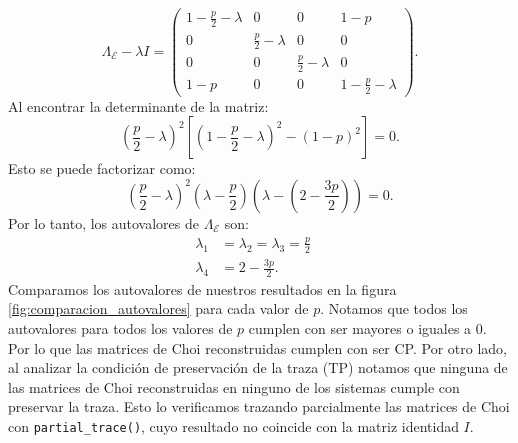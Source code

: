 \documentclass[letterpaper,12pt]{thesisECFM}
\theoremstyle{plain}
\theoremstyle{definition}
\theoremstyle{remark}
\newcommand{\1}{\mathbb{1}}
\begin{document}
\begin{equation}
\Lambda_\mathcal{E} - \lambda I = \begin{pmatrix}
1 - \frac{p}{2} - \lambda & 0 & 0 & 1 - p \\
0 & \frac{p}{2} - \lambda & 0 & 0 \\
0 & 0 & \frac{p}{2} - \lambda & 0 \\
1 - p & 0 & 0 & 1 - \frac{p}{2} - \lambda
\end{pmatrix}.
\end{equation}
Al encontrar la determinante de la matriz:
\begin{equation}
\left( \frac{p}{2} - \lambda \right)^2  \left[ \left( 1 - \frac{p}{2} - \lambda \right)^2 - (1 - p)^2 \right] = 0.
\end{equation}
Esto se puede factorizar como:
\begin{equation}
\left( \frac{p}{2} - \lambda \right)^2 \left( \lambda - \frac{p}{2} \right) \left( \lambda - \left( 2 - \frac{3p}{2} \right) \right) = 0.
\end{equation}
Por lo tanto, los autovalores de $\Lambda_{\mathcal{E}}$ son:
\begin{align}
\lambda_1 &=\lambda_2=\lambda_3 = \frac{p}{2} \quad \\
\lambda_4 &= 2 - \frac{3p}{2} .
\end{align}
Comparamos los autovalores de nuestros resultados en la figura \ref{fig:comparacion_autovalores} para cada valor de $p$. Notamos que todos los autovalores para todos los valores de $p$ cumplen con ser mayores o iguales a 0. Por lo que las matrices de Choi reconstruidas cumplen con ser CP. 
Por otro lado, al analizar la condición de preservación de la traza (TP) notamos que ninguna de las matrices de Choi reconstruidas en ninguno de los sistemas cumple con preservar la traza. Esto lo verificamos trazando parcialmente las matrices de Choi con \texttt{partial\_trace()}, cuyo resultado no coincide con la matriz identidad $I$. 
\end{document}
